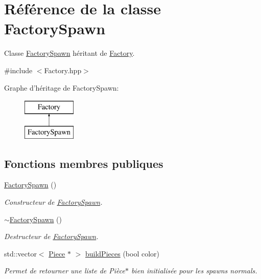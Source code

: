 \hypertarget{class_factory_spawn}{\section{Référence de la classe Factory\-Spawn}
\label{class_factory_spawn}
}


Classe \hyperlink{class_factory_spawn}{Factory\-Spawn} héritant de \hyperlink{class_factory}{Factory}.  




{\ttfamily \#include $<$Factory.\-hpp$>$}

Graphe d'héritage de Factory\-Spawn\-:\begin{figure}[H]
\begin{center}
\leavevmode
\includegraphics[height=2.000000cm]{class_factory_spawn}
\end{center}
\end{figure}
\subsection*{Fonctions membres publiques}
\begin{DoxyCompactItemize}
\item 
\hyperlink{class_factory_spawn_afa2ea203f016dc06217ab48607c4e899}{Factory\-Spawn} ()
\begin{DoxyCompactList}\small\item\em Constructeur de \hyperlink{class_factory_spawn}{Factory\-Spawn}. \end{DoxyCompactList}\item 
\hyperlink{class_factory_spawn_ae7ec52abd4b3dc1e49cd9988a1d1d9bc}{$\sim$\-Factory\-Spawn} ()
\begin{DoxyCompactList}\small\item\em Destructeur de \hyperlink{class_factory_spawn}{Factory\-Spawn}. \end{DoxyCompactList}\item 
std\-::vector$<$ \hyperlink{class_piece}{Piece} $\ast$ $>$ \hyperlink{class_factory_spawn_acdae41c4747246f35de741b32b3f74ac}{build\-Pieces} (bool color)
\begin{DoxyCompactList}\small\item\em Permet de retourner une liste de Pièce$\ast$ bien initialisée pour les spawns normals. \end{DoxyCompactList}\end{DoxyCompactItemize}


